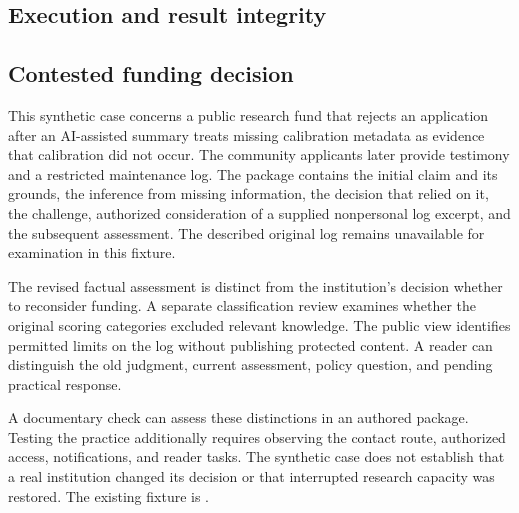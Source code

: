 \documentclass[11pt,a4paper]{article}
\begin{document}
\subsection{Execution and result integrity}

\subsection{Contested funding decision}
This synthetic case concerns a public research fund that rejects an application after an AI-assisted summary treats missing calibration metadata as evidence that calibration did not occur. The community applicants later provide testimony and a restricted maintenance log. The package contains the initial claim and its grounds, the inference from missing information, the decision that relied on it, the challenge, authorized consideration of a supplied nonpersonal log excerpt, and the subsequent assessment. The described original log remains unavailable for examination in this fixture.

The revised factual assessment is distinct from the institution's decision whether to reconsider funding. A separate classification review examines whether the original scoring categories excluded relevant knowledge. The public view identifies permitted limits on the log without publishing protected content. A reader can distinguish the old judgment, current assessment, policy question, and pending practical response.

A documentary check can assess these distinctions in an authored package. Testing the practice additionally requires observing the contact route, authorized access, notifications, and reader tasks. The synthetic case does not establish that a real institution changed its decision or that interrupted research capacity was restored. The existing fixture is .
\end{document}
